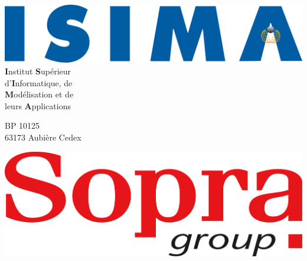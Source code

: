 \thispagestyle{empty}

\makeatletter %



\begin{multicols}{2}
	\begin{flushleft}
	
	
		\includegraphics[scale=0.09]{img/ISIMA.png}							\\
		
		\textbf{I}nstitut \textbf{S}upérieur								\\
		d'\textbf{I}nformatique, de											\\
		\textbf{M}odélisation et de											\\
		leurs \textbf{A}pplications	
		
		\vspace*{0.5cm}
		
		BP 10125															\\
		63173 Aubière Cedex
		
		
	\end{flushleft}
\columnbreak
	\begin{flushright}
	
		
		\includegraphics[scale=0.07]{img/Sopra_Group.png}					\\
		

\end{flushright}
\end{multicols}
